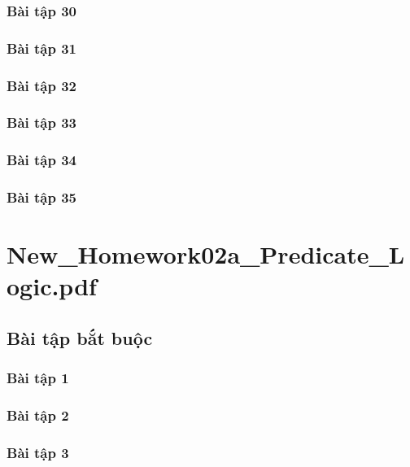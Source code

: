 \documentclass[a4paper]{article}
\begin{document}
\clearpage
\subsubsection{Bài tập 30}

\clearpage
\subsubsection{Bài tập 31}

\clearpage
\subsubsection{Bài tập 32}

\clearpage
\subsubsection{Bài tập 33}

\clearpage
\subsubsection{Bài tập 34}

\clearpage
\subsubsection{Bài tập 35}

\clearpage
\clearpage

\section{New\_Homework02a\_Predicate\_Logic.pdf}
\subsection{Bài tập bắt buộc}
\subsubsection{Bài tập 1}

\clearpage
\subsubsection{Bài tập 2}

\clearpage
\subsubsection{Bài tập 3}

\clearpage
\end{document}
